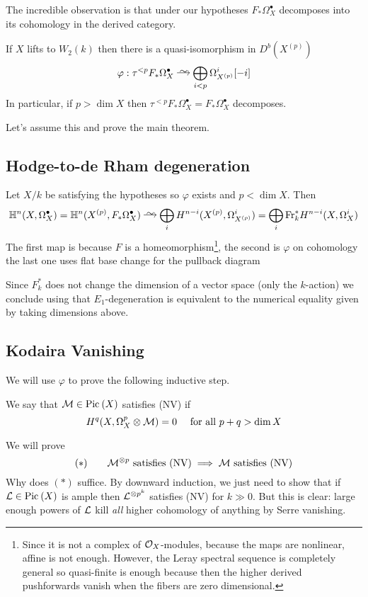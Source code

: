 \documentclass[12pt]{article}
\newcommand{\HH}{\mathbb{H}}
\begin{document}
The incredible observation is that under our hypotheses $F_* \Omega_X^\bullet$ decomposes into its cohomology in the derived category.

\begin{theorem}
If $X$ lifts to $W_2(k)$ then there is a quasi-isomorphism in $D^b(X^{(p)})$ 
\[ \varphi : \tau^{<p} F_* \Omega_X^\bullet \iso \bigoplus_{i < p} \Omega_{X^{(p)}}^i [-i] \]
In particular, if $p > \dim{X}$ then $\tau^{<p} F_* \Omega_X^\bullet = F_* \Omega_X^\bullet$ decomposes.
\end{theorem}

Let's assume this and prove the main theorem.

\subsection{Hodge-to-de Rham degeneration}

Let $X / k$ be satisfying the hypotheses so $\varphi$ exists and $p < \dim{X}$. Then
\[ \HH^n(X, \Omega_X^\bullet) = \HH^n(X^{(p)}, F_* \Omega_X^\bullet) \iso \bigoplus_i H^{n-i}(X^{(p)}, \Omega^i_{X^{(p)}}) = \bigoplus_{i} \Fr_k^* H^{n-i}(X, \Omega_X^i)  \]
The first map is because $F$ is a homeomorphism\footnote{Since it is not a complex of $\mathcal{O}_{X}$-modules, because the maps are nonlinear, affine is not enough. However, the Leray spectral sequence is completely general so quasi-finite is enough because then the higher derived pushforwards vanish when the fibers are zero dimensional.}, the second is $\varphi$ on cohomology the last one uses flat base change for the pullback diagram
\begin{center}
\end{center}
Since $F_k^*$ does not change the dimension of a vector space (only the $k$-action) we conclude using that $E_1$-degeneration is equivalent to the numerical equality given by taking dimensions above.

\subsection{Kodaira Vanishing}

We will use $\varphi$ to prove the following inductive step. 
\begin{defn}
We say that $\mathcal{M} \in \mathrm{Pic}^{} \left( X \right)$ satisfies (NV) if 
\[ H^q(X, \Omega_X^p \otimes \mathcal{M}) = 0 \quad \text{ for all } p + q > \dim{X} \]
\end{defn}
We will prove
\[ (\ast) \quad \quad \mathcal{M}^{\otimes p} \text{ satisfies (NV)} \implies \mathcal{M} \text{ satisfies (NV)} \]
Why does $(\ast)$ suffice. By downward induction, we just need to show that if $\mathcal{L} \in \mathrm{Pic}^{} \left( X \right)$ is ample then $\mathcal{L}^{\otimes p^k}$ satisfies (NV) for $k \gg 0$. But this is clear: large enough powers of $\mathcal{L}$ kill \textit{all} higher cohomology of anything by Serre vanishing. 
\end{document}
